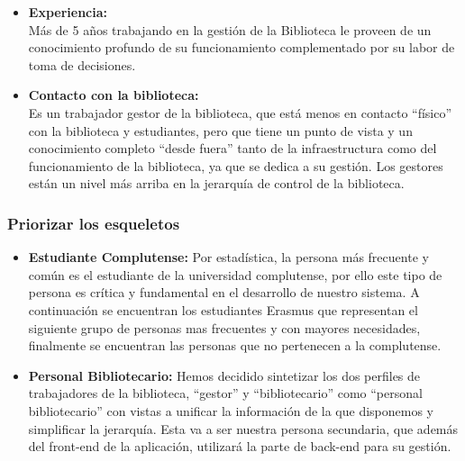 \documentclass[12pt]{article}
\begin{document}
\begin{itemize}
\begin{itemize}
\begin{itemize}
		\item \textbf{Experiencia: \\}
			Más de 5 años trabajando en la gestión de la Biblioteca le proveen de un conocimiento profundo de su funcionamiento complementado por su labor de toma de decisiones.
			
		\item \textbf{Contacto con la biblioteca: \\}
			Es un trabajador gestor de la biblioteca, que está menos en contacto ``físico'' con la biblioteca y estudiantes, pero que tiene un punto de vista y un conocimiento completo ``desde fuera'' tanto de la infraestructura como del funcionamiento de la biblioteca, ya que se dedica a su gestión. Los gestores están un nivel más arriba en la jerarquía de control de la biblioteca.
			
	\end{itemize}
\end{itemize}

\subsubsection{Priorizar los esqueletos}
\begin{itemize}
	\item \textbf{Estudiante Complutense:}
		Por estadística, la persona más frecuente y común es el estudiante de la universidad complutense, por ello este tipo de persona es crítica y fundamental en el desarrollo de nuestro sistema.
		A continuación se encuentran los estudiantes Erasmus que representan el siguiente grupo de personas mas frecuentes y con mayores necesidades, finalmente se encuentran las personas que no pertenecen a la complutense.

	\item \textbf{Personal Bibliotecario:}
		Hemos decidido sintetizar los dos perfiles de trabajadores de la biblioteca, ``gestor'' y ``bibliotecario'' como ``personal bibliotecario'' con vistas a unificar la información de la que disponemos y simplificar la jerarquía. Esta va a ser nuestra persona secundaria, que además del front-end de la aplicación, utilizará la parte de back-end para su gestión.

\end{itemize}

\newpage

\end{itemize}
\end{document}
